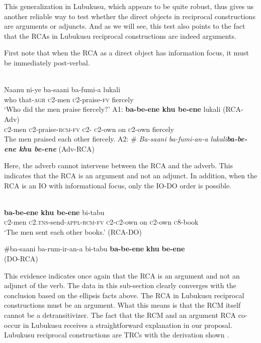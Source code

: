 \documentclass[output=paper]{langsci/langscibook}
\begin{document}
This generalization in Lubukusu, which appears to be quite robust, thus gives us another reliable way to test whether the direct objects in reciprocal constructions are arguments or adjuncts. And as we will see, this test also points to the fact that the RCAs in Lubukusu reciprocal constructions are indeed  arguments.

First note that when the RCA as a direct object has information focus, it must be immediately post-verbal. 


\ea\label{ex:}
\\
\gll Naanu  ni-ye     ba-saani   ba-fumi-a   lukali \\
who   that-\textsc{agr}  \textsc{c}2-men   \textsc{c}2-praise-\textsc{fv}   fiercely \\
\glt ‘Who did the men praise fiercely?’
  A1: 
      \textbf{{ba-be-ene    khu be-ene}} {  lukali}    (RCA-Adv) \\     \textsc{c}2-men   \textsc{c}2-praise-\textsc{rcm-fv}       \textsc{c}2-\textsc{ c}2-own  on   \textsc{c}2-own  fiercely\\
\glt    The men praised each other fiercely.
  A2:   \#\textit{ Ba-saani ba-fumi-an-a   lukali}\textbf{\textit{ba-be-ene khu be-ene}}     (Adv-RCA)  
\z


Here, the adverb cannot intervene between the RCA and the adverb. This indicates that the RCA is an argument and not an adjunct. In addition, when the RCA is an IO with informational focus, only the IO-DO order is possible.


\ea\label{ex:}
  \\
\ea
{}    \textbf{{ba-be-ene  khu be-ene}}  bi-tabu      \\
\textsc{c}2-men   \textsc{c2.tns}-send-\textsc{appl-rcm-fv}     \textsc{c2-c2}-own on   \textsc{c}2-own   \textsc{c}8-book       \\
\glt    ‘The men sent each other books.’          (RCA-DO)

\ex
   \#{ba-saani   ba-rum-ir-an-a  bi-tabu}   \textbf{ba-be-ene} \textbf{khu} \textbf{be-ene}\\ 
\glt                      (DO-RCA)
\z
\z

This evidence indicates once again that the RCA is an argument and not an adjunct of the verb. The data in this sub-section clearly converges with the conclusion based on the ellipsis facts above. The RCA in Lubukusu reciprocal constructions must be an argument. What this means is that the RCM itself cannot be a detransitivizer. The fact that the RCM and an argument RCA co-occur in Lubukusu receives a straightforward explanation in our proposal. Lubukusu reciprocal constructions are TRCs with the derivation shown . 
\end{document}
